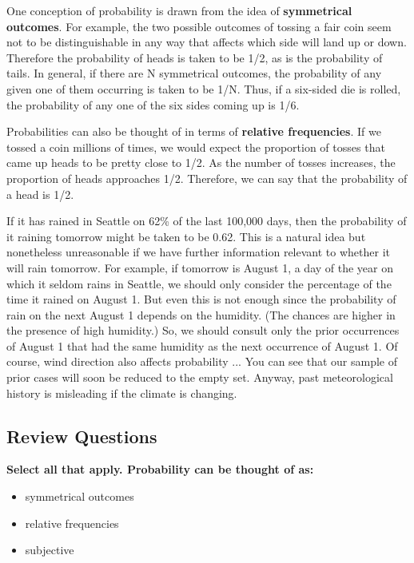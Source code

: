 \documentclass[
  11pt,
,
onecolumn,
openany
]{book}
\begin{document}
One conception of probability is drawn from the idea of \textbf{symmetrical
outcomes}. For example, the two possible outcomes of tossing a fair coin seem
not to be distinguishable in any way that affects which side will land up or
down. Therefore the probability of heads is taken to be 1/2, as is the
probability of tails. In general, if there are N symmetrical outcomes, the
probability of any given one of them occurring is taken to be 1/N. Thus, if a
six-sided die is rolled, the probability of any one of the six sides coming up
is 1/6.

Probabilities can also be thought of in terms of \textbf{relative
frequencies}. If we tossed a coin millions of times, we would expect the
proportion of tosses that came up heads to be pretty close to 1/2. As the
number of tosses increases, the proportion of heads approaches 1/2. Therefore,
we can say that the probability of a head is 1/2.

If it has rained in Seattle on 62\% of the last 100,000 days, then the
probability of it raining tomorrow might be taken to be 0.62. This is a
natural idea but nonetheless unreasonable if we have further information
relevant to whether it will rain tomorrow. For example, if tomorrow is August
1, a day of the year on which it seldom rains in Seattle, we should only
consider the percentage of the time it rained on August 1. But even this is
not enough since the probability of rain on the next August 1 depends on the
humidity. (The chances are higher in the presence of high humidity.) So, we
should consult only the prior occurrences of August 1 that had the same
humidity as the next occurrence of August 1. Of course, wind direction also
affects probability ... You can see that our sample of prior cases will soon
be reduced to the empty set. Anyway, past meteorological history is misleading
if the climate is changing.

\hypertarget{review-questions}{%
\subsection{Review Questions}\label{review-questions}}

\textbf{Select all that apply. Probability can be thought of as:}

\begin{itemize}
\item
  symmetrical outcomes
\item
  relative frequencies
\item
  subjective
\end{itemize}
\end{document}
